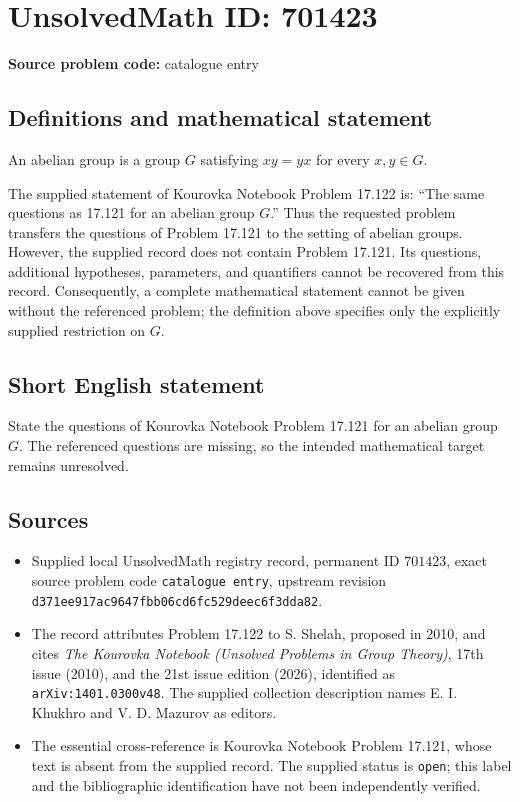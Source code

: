 \documentclass[11pt]{article}
\begin{document}
\section*{UnsolvedMath ID: 701423}
\textbf{Source problem code:} catalogue entry
\subsection{Definitions and mathematical statement}
An abelian group is a group \(G\) satisfying \(xy=yx\) for every \(x,y\in G\).

The supplied statement of Kourovka Notebook Problem 17.122 is: ``The same questions as 17.121 for an abelian group \(G\).'' Thus the requested problem transfers the questions of Problem 17.121 to the setting of abelian groups. However, the supplied record does not contain Problem 17.121. Its questions, additional hypotheses, parameters, and quantifiers cannot be recovered from this record. Consequently, a complete mathematical statement cannot be given without the referenced problem; the definition above specifies only the explicitly supplied restriction on \(G\).
\subsection{Short English statement}
State the questions of Kourovka Notebook Problem 17.121 for an abelian group \(G\). The referenced questions are missing, so the intended mathematical target remains unresolved.
\subsection{Sources}
\begin{itemize}
\item Supplied local UnsolvedMath registry record, permanent ID \(701423\), exact source problem code \texttt{catalogue entry}, upstream revision \texttt{d371ee917ac9647fbb06cd6fc529deec6f3dda82}.
\item The record attributes Problem 17.122 to S. Shelah, proposed in 2010, and cites \emph{The Kourovka Notebook (Unsolved Problems in Group Theory)}, 17th issue (2010), and the 21st issue edition (2026), identified as \texttt{arXiv:1401.0300v48}. The supplied collection description names E. I. Khukhro and V. D. Mazurov as editors.
\item The essential cross-reference is Kourovka Notebook Problem 17.121, whose text is absent from the supplied record. The supplied status is \texttt{open}; this label and the bibliographic identification have not been independently verified.
\end{itemize}
\end{document}
